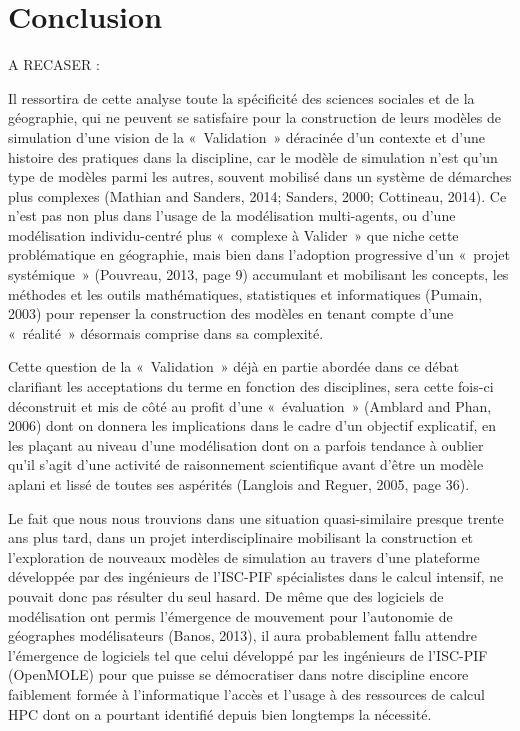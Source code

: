 \graphicspath{{Conclusion/}}

\chapter{Conclusion}

\startcontents[chapters]
\Mprintcontents
A RECASER : 

Il ressortira de cette analyse toute la spécificité des sciences sociales et de la géographie, qui ne peuvent se satisfaire pour la construction de leurs modèles de simulation d'une vision de la « Validation » déracinée d'un contexte et d'une histoire des pratiques dans la discipline, car le modèle de simulation n'est qu'un type de modèles parmi les autres, souvent mobilisé dans un système de démarches plus complexes (Mathian and Sanders, 2014; Sanders, 2000; Cottineau, 2014)⁠. Ce n'est pas non plus dans l'usage de la modélisation multi-agents, ou d'une modélisation individu-centré plus « complexe à Valider » que niche cette problématique en géographie, mais bien dans l'adoption progressive d'un « projet systémique » (Pouvreau, 2013, page 9)⁠ accumulant et mobilisant les concepts, les méthodes et les outils mathématiques, statistiques et informatiques (Pumain, 2003)⁠ pour repenser la construction des modèles en tenant compte d'une « réalité » désormais comprise dans sa complexité. 

Cette question de la « Validation » déjà en partie abordée dans ce débat clarifiant les acceptations du terme en fonction des disciplines, sera cette fois-ci déconstruit et mis de côté au profit d'une « évaluation »  (Amblard and Phan, 2006)⁠   dont on donnera les implications dans le cadre d'un objectif explicatif, en les plaçant au niveau d'une modélisation dont on a parfois tendance à oublier qu'il s'agit d'une activité de raisonnement scientifique avant d'être un modèle aplani et lissé de toutes ses aspérités (Langlois and Reguer, 2005, page 36)⁠.  


Le fait que nous nous trouvions dans une situation quasi-similaire presque trente ans plus tard, dans un projet interdisciplinaire mobilisant la construction et l'exploration de nouveaux modèles de simulation au travers d'une plateforme développée par des ingénieurs de l'ISC-PIF spécialistes dans le calcul intensif, ne pouvait donc pas résulter du seul hasard. De même que des logiciels de modélisation ont permis l'émergence de mouvement pour l'autonomie de géographes modélisateurs (Banos, 2013)⁠, il aura probablement fallu attendre l'émergence de logiciels tel que celui développé par les ingénieurs de l'ISC-PIF (OpenMOLE) pour que puisse se démocratiser dans notre discipline encore faiblement formée à l'informatique l'accès et l'usage à des ressources de calcul HPC dont on a pourtant identifié depuis bien longtemps la nécessité. 

